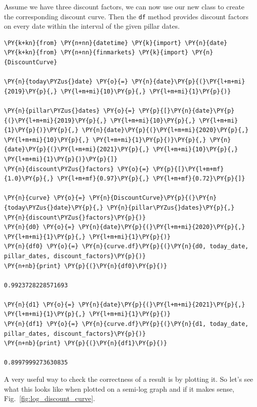 Assume we have three discount factors, we can now use our new class to create the corresponding
discount curve. Then the \texttt{df} method provides discount factors on every date within the interval of the given pillar dates.

\begin{codebox}
\begin{Verbatim}[commandchars=\\\{\}]
\PY{k+kn}{from} \PY{n+nn}{datetime} \PY{k}{import} \PY{n}{date}
\PY{k+kn}{from} \PY{n+nn}{finmarkets} \PY{k}{import} \PY{n}{DiscountCurve}
	
\PY{n}{today\PYZus{}date} \PY{o}{=} \PY{n}{date}\PY{p}{(}\PY{l+m+mi}{2019}\PY{p}{,} \PY{l+m+mi}{10}\PY{p}{,} \PY{l+m+mi}{1}\PY{p}{)}
	
\PY{n}{pillar\PYZus{}dates} \PY{o}{=} \PY{p}{[}\PY{n}{date}\PY{p}{(}\PY{l+m+mi}{2019}\PY{p}{,} \PY{l+m+mi}{10}\PY{p}{,} \PY{l+m+mi}{1}\PY{p}{)}\PY{p}{,} \PY{n}{date}\PY{p}{(}\PY{l+m+mi}{2020}\PY{p}{,} \PY{l+m+mi}{10}\PY{p}{,} \PY{l+m+mi}{1}\PY{p}{)}\PY{p}{,} \PY{n}{date}\PY{p}{(}\PY{l+m+mi}{2021}\PY{p}{,} \PY{l+m+mi}{10}\PY{p}{,} \PY{l+m+mi}{1}\PY{p}{)}\PY{p}{]}
\PY{n}{discount\PYZus{}factors} \PY{o}{=} \PY{p}{[}\PY{l+m+mf}{1.0}\PY{p}{,} \PY{l+m+mf}{0.97}\PY{p}{,} \PY{l+m+mf}{0.72}\PY{p}{]}

\PY{n}{curve} \PY{o}{=} \PY{n}{DiscountCurve}\PY{p}{(}\PY{n}{today\PYZus{}date}\PY{p}{,} \PY{n}{pillar\PYZus{}dates}\PY{p}{,} \PY{n}{discount\PYZus{}factors}\PY{p}{)}
\PY{n}{d0} \PY{o}{=} \PY{n}{date}\PY{p}{(}\PY{l+m+mi}{2020}\PY{p}{,} \PY{l+m+mi}{1}\PY{p}{,} \PY{l+m+mi}{1}\PY{p}{)}
\PY{n}{df0} \PY{o}{=} \PY{n}{curve.df}\PY{p}{(}\PY{n}{d0, today_date, pillar_dates, discount_factors}\PY{p}{)}
\PY{n+nb}{print} \PY{p}{(}\PY{n}{df0}\PY{p}{)}

0.9923728228571693

\PY{n}{d1} \PY{o}{=} \PY{n}{date}\PY{p}{(}\PY{l+m+mi}{2021}\PY{p}{,} \PY{l+m+mi}{1}\PY{p}{,} \PY{l+m+mi}{1}\PY{p}{)}
\PY{n}{df1} \PY{o}{=} \PY{n}{curve.df}\PY{p}{(}\PY{n}{d1, today_date, pillar_dates, discount_factors}\PY{p}{)}
\PY{n+nb}{print} \PY{p}{(}\PY{n}{df1}\PY{p}{)}

0.8997999273630835
\end{Verbatim}
\end{codebox}

A very useful way to check the correctness of a result is by plotting it. So let's see what this looks like when plotted on a semi-log graph and if it makes sense, Fig.~\ref{fig:log_discount_curve}.

